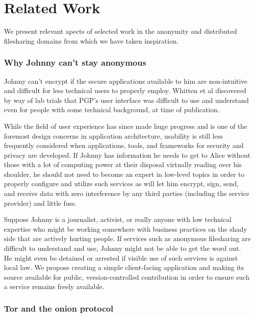 
\section{Related Work}

We present relevant apects of selected work in the anonymity and
distributed filesharing domains from which we have taken inspiration.

\subsubsection*{Why Johnny can't stay anonymous}

Johnny can't encrypt if the secure applications available to him are non-intuitive and difficult for
less technical users to properly employ. Whitten et al discovered by way of lab trials that PGP's
user interface was difficult to use and understand even for people with some technical background,
at time of publication.

While the field of user experience has since made huge progress and is one of the foremost design
concerns in application architecture, usability is still less frequently considered when applications,
tools, and frameworks for security and privacy are developed. If Johnny has information he needs
to get to Alice without those with a lot of computing power at their disposal virtually reading over
his shoulder, he should not need to become an expert in low-level topics in order to properly configure
and utilize such services as will let him encrypt, sign, send, and receive data with zero interference
by any third parties (including the service provider) and little fuss.

Suppose Johnny is a journalist, activist, or really anyone with low technical expertise who might be working
somewhere with business practices on the shady side that are actively hurting people.
If services such as anonymous filesharing are difficult to understand and use, Johnny might not be able to get the
word out. He might even be detained or arrested if visible use of such services is against local law. We
propose creating a simple client-facing application and making its source available for public, version-controlled
contribution in order to ensure such a service remains freely available.

\subsubsection*{Tor and the onion protocol}

